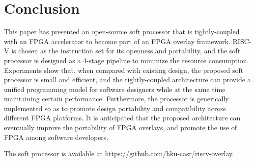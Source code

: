\section{Conclusion}
\label{sec:conclusion}

This paper has presented an open-source soft processor that is tightly-coupled with an FPGA accelerator to become part of an FPGA overlay framework. RISC-V is chosen as the instruction set for its openness and portability, and the soft processor is designed as a 4-stage pipeline to minimize the resource consumption. %
Experiments show that, when compared with existing design, the proposed soft processor is small and efficient, and the tightly-coupled architecture can provide a unified programming model for software designers while at the same time maintaining certain performance. Furthermore, the processor is generically implemented so as to promote design portability and compatibility across different FPGA platforms.  It is anticipated that the proposed architecture can eventually improve the portability of FPGA overlays, and promote the use of FPGA among software developers.

The soft processor is available at https://github.com/hku-casr/riscv-overlay.
